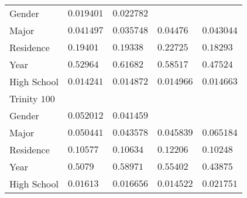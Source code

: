 \begin{center}
\begin{longtable}{|l|l|l|l|l|}
Gender & $0.019401$ & $0.022782$ & & \\
Major & $0.041497$ & $0.035748$ & $0.04476$ & $0.043044$ \\
Residence & $0.19401$ & $0.19338$ & $0.22725$ & $0.18293$ \\
Year & $0.52964$ & $0.61682$ & $0.58517$ & $0.47524$ \\
High School & $0.014241$ & $0.014872$ & $0.014966$ & $0.014663$ \\ \hline \hline
Trinity $100$ & & &   \\ \hline
Gender & $0.052012$ & $0.041459$ & & \\
Major & $0.050441$ & $0.043578$ & $0.045839$ & $0.065184$ \\
Residence & $0.10577$ & $0.10634$ & $0.12206$ & $0.10248$ \\
Year & $0.5079$ & $0.58971$ & $0.55402$ & $0.43875$ \\
High School & $0.01613$ & $0.016656$ & $0.014522$ & $0.021751$ \\
\end{longtable}
\end{center}



